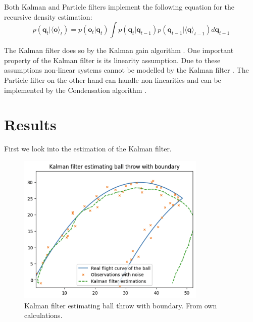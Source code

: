 \documentclass[conference]{IEEEtran}
\begin{document}
Both Kalman and Particle filters implement the following equation for the recursive density estimation:
\begin{equation*}
    p(\textbf{q}_t | \langle \textbf{o} \rangle _t) =
    p(\textbf{o}_t | \textbf{q}_t) \int p(\textbf{q}_t | \textbf{q}_{t-1}) p(\textbf{q}_{t-1} | \langle \textbf{q} \rangle _{t-1}) d \textbf{q}_{t-1}
\tag{5}
\end{equation*}

The Kalman filter does so by the Kalman gain algorithm \cite{b2}.
One important property of the Kalman filter is its linearity assumption.
Due to these assumptions non-linear systems cannot be modelled by the Kalman filter \cite{b2}. %
The Particle filter on the other hand can handle non-linearities and can be implemented by the Condensation algorithm \cite{b3}. 





\section{Results}

First we look into the estimation of the Kalman filter. 
\begin{figure}[h]
\centerline{\includegraphics[width=90mm]{figs/kalman-filter.png}}
\caption{Kalman filter estimating ball throw with boundary. From own calculations.}
\label{fig:kalman-filter}
\end{figure}
\end{document}
